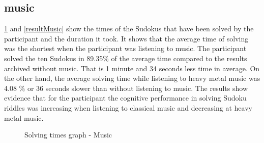 \FloatBarrier

\subsection{music}

\ref{resultMusicGraph} and \ref{resultMusic} show the times of the Sudokus that have been solved by the participant and the duration it took. It shows that the average time of solving was the shortest when the participant was listening to music. 
The participant solved the ten Sudokus in 89.35\% of the average time compared to the results archived without music. That is 1 minute and 34 seconds less time in average. 
On the other hand, the average solving time while listening to heavy metal music was 4.08 \% or 36 seconds slower than without listening to music. 
The results show evidence that for the participant the cognitive performance in solving Sudoku riddles was increasing when listening to classical music and decreasing at heavy metal music. 

\FloatBarrier

\begin{figure}[ht]
	\centering
 	\caption{Solving times graph - Music}\label{resultMusicGraph}
 	\vspace{10 mm}
\end{figure}


%

